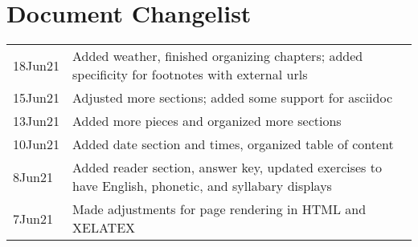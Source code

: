 \chapter{Document Changelist}
\begin{tabular}{p{3cm} p{11cm}}
18Jun21 & Added weather, finished organizing chapters; added specificity for footnotes with external urls\\
15Jun21 & Adjusted more sections; added some support for asciidoc\\
13Jun21 & Added more pieces and organized more sections \\
10Jun21 & Added date section and times, organized table of content\\
8Jun21 & Added reader section, answer key, updated exercises to have English, phonetic, and syllabary displays \\
7Jun21 & Made adjustments for page rendering in HTML and XELATEX
\end{tabular}